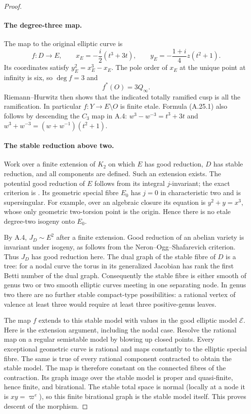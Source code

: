 \begin{proof}
\paragraph{The degree-three map.}
The map to the original elliptic curve is
\[
 f:D\longrightarrow E,\qquad
 x_E=-\frac{i}{2}(t^3+3t),\qquad
 y_E=-\frac{1+i}{4}z(t^2+1).
                                                        \tag{A.25.1}
\]
Its coordinates satisfy $y_E^2=x_E^3-x_E$.
The pole order of $x_E$ at the unique point at infinity
is six, so $\deg f=3$ and
\[
                         f^*(O)=3Q_\infty.              \tag{A.25.2}
\]
Riemann--Hurwitz then shows that the indicated totally
ramified cusp is all the ramification. In particular
$f:Y\to E\setminus O$ is finite etale. Formula (A.25.1)
also follows by descending the $C_3$ map in A.4:
$w^3-w^{-3}=t^3+3t$ and
$w^3+w^{-3}=(w+w^{-1})(t^2+1)$.

\paragraph{The stable reduction above two.}
Work over a finite extension of $K_2$ on which $E$ has
good reduction, $D$ has stable reduction, and all
components are defined. Such an extension exists.
The potential good reduction of $E$ follows from its
integral $j$-invariant; the exact criterion is
\cite[Proposition VII.5.5]{fghSilvermanAEC}.
Its geometric special fibre $E_0$ has $j=0$ in
characteristic two and is supersingular. For example,
over an algebraic closure its equation is
$y^2+y=x^3$, whose only geometric two-torsion point is
the origin. Hence there is no etale degree-two isogeny
onto $E_0$.

By A.4, $J_D\sim E^2$ after a finite extension.
Good reduction of an abelian variety is invariant
under isogeny, as follows from the
Neron--Ogg--Shafarevich criterion. Thus $J_D$ has good
reduction here. The dual graph of the stable fibre of
$D$ is a tree: for a nodal curve the torus in its
generalized Jacobian has rank the first Betti number
of the dual graph. Consequently the stable fibre is
either smooth of genus two or two smooth elliptic
curves meeting in one separating node. In genus two
there are no further stable compact-type possibilities:
a rational vertex of valence at least three would
require at least three positive-genus leaves.

The map $f$ extends to this stable model with values in
the good elliptic model $\mathcal E$. Here is the
extension argument, including the nodal case.
Resolve the rational map on a regular semistable model
by blowing up closed points. Every exceptional
geometric curve is rational and maps constantly to
the elliptic special fibre. The same is true of every
rational component contracted to obtain the stable
model. The map is therefore constant on the connected
fibres of the contraction. Its graph image over the
stable model is proper and quasi-finite, hence finite,
and birational. The stable total space is normal
(locally at a node it is $xy=\varpi^e$), so this finite
birational graph is the stable model itself. This
proves descent of the morphism.


\end{proof}
